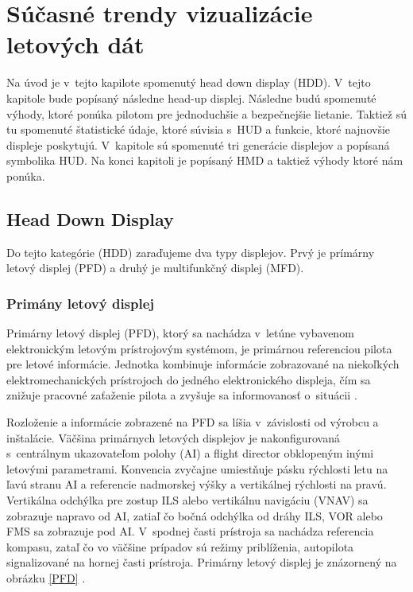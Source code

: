 \chapter{Súčasné trendy vizualizácie letových dát}
Na úvod je v~tejto kapilote spomenutý head down display (HDD). V~tejto kapitole bude popísaný následne head-up displej. Následne budú spomenuté výhody, ktoré ponúka pilotom pre jednoduchšie a bezpečnejšie lietanie. Taktiež sú tu spomenuté štatistické údaje, ktoré súvisia s~HUD a funkcie, ktoré najnovšie displeje poskytujú. V~kapitole sú spomenuté tri generácie displejov a popísaná symbolika HUD. Na konci kapitoli je popísaný HMD a taktiež výhody ktoré nám ponúka.

\section{Head Down Display}
Do tejto kategórie (HDD) zaraďujeme dva typy displejov. Prvý je prímárny letový displej (PFD) a druhý je multifunkčný displej (MFD).

\subsection{Primány letový displej}
Primárny letový displej (PFD), ktorý sa nachádza v~letúne vybavenom elektronickým letovým prístrojovým systémom, je primárnou referenciou pilota pre letové informácie. Jednotka kombinuje informácie zobrazované na niekoľkých elektromechanických prístrojoch do jedného elektronického displeja, čím sa znižuje pracovné zaťaženie pilota a zvyšuje sa informovanosť o~situácii \cite{pfd}.

Rozloženie a informácie zobrazené na PFD sa líšia v~závislosti od výrobcu a inštalácie. Väčšina primárnych letových displejov je nakonfigurovaná s~centrálnym ukazovateľom polohy (AI) a flight director obklopeným inými letovými parametrami. Konvencia zvyčajne umiestňuje pásku rýchlosti letu na ľavú stranu AI a referencie nadmorskej výšky a vertikálnej rýchlosti na pravú. Vertikálna odchýlka pre zostup ILS alebo vertikálnu navigáciu (VNAV) sa zobrazuje napravo od AI, zatiaľ čo bočná odchýlka od dráhy ILS, VOR alebo FMS sa zobrazuje pod AI. V~spodnej časti prístroja sa nachádza referencia kompasu, zataľ čo vo väčšine prípadov sú režimy priblíženia, autopilota signalizované na hornej časti prístroja. Primárny letový displej je znázornený na obrázku \ref{PFD} \cite{pfd}.

